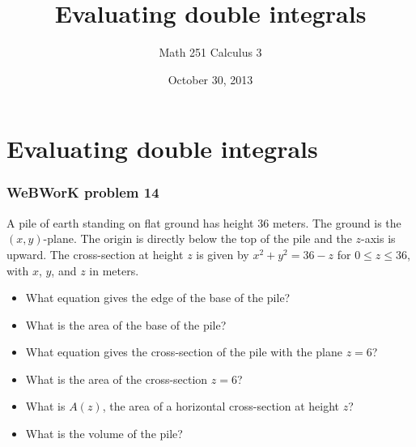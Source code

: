 \documentclass[11pt,ignorenonframetext,aspectratio=169,xcolor={svgnames}]{beamer}
\title{Evaluating double integrals}
\author{Math 251 Calculus 3}
\date{October 30, 2013}
\begin{document}
\frame{\titlepage}

\section{Evaluating double integrals}

\begin{frame}\frametitle{WeBWorK problem 14}

A pile of earth standing on flat ground has height $36$ meters. The
ground is the $(x,y)$-plane. The origin is directly below the top of the
pile and the $z$-axis is upward. The cross-section at height $z$ is
given by $x^2+y^2=36-z$ for $0 \leq z \leq 36$, with $x$, $y$, and $z$
in meters.

\begin{itemize}
\itemsep1pt\parskip0pt
\item
  What equation gives the edge of the base of the pile?
\item
  What is the area of the base of the pile?
\item
  What equation gives the cross-section of the pile with the plane
  $z = 6$?
\item
  What is the area of the cross-section $z = 6$?
\item
  What is $A(z)$, the area of a horizontal cross-section at height $z$?
\item
  What is the volume of the pile?
\end{itemize}

\end{frame}
\end{document}
